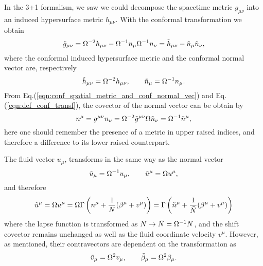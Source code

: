 In the 3+1 formalism, we saw we could decompose the spacetime metric $g_{\mu\nu}$ into an induced hypersurface metric $h_{\mu\nu}$. With the conformal transformation we obtain
\begin{equation}
    \Tilde{g}_{\mu\nu}=\Omega^{-2}h_{\mu\nu}-\Omega^{-1}n_\mu\Omega^{-1}n_\nu=\Tilde{h}_{\mu\nu}-\Tilde{n}_\mu\Tilde{n}_\nu,
    \label{eqn:conf_metric_decomp}
\end{equation}
where the conformal induced hypersurface metric and the conformal normal vector are, respectively
\begin{equation}
    \Tilde{h}_{\mu\nu}=\Omega^{-2}h_{\mu\nu}, \qquad \Tilde{n}_\mu=\Omega^{-1}n_\mu.
    \label{eqn:conf_spatial_metric_and_conf_normal_vec}
\end{equation}
From Eq.(\ref{eqn:conf_spatial_metric_and_conf_normal_vec}) and Eq.(\ref{eqn:def_conf_transf}), the covector of the normal vector can be obtain by
\begin{equation}
    n^\mu = g^{\mu\nu} n_\nu = \Omega^{-2} \Tilde{g}^{\mu\nu} \Omega \Tilde{n}_\nu = \Omega^{-1}\Tilde{n}^\mu,
\end{equation}
here one should remember the presence of a metric in upper raised indices, and therefore a difference to its lower raised counterpart.

The fluid vector $u_\mu$, transforms in the same way as the normal vector
\begin{equation}
    \Tilde{u}_\mu = \Omega^{-1}u_\mu, \qquad \Tilde{u}^\mu=\Omega u^\mu, 
\end{equation}
and therefore
\begin{equation}
    \Tilde{u}^\mu = \Omega u^\mu = \Omega \Gamma \left(n^\mu+\frac{1}{N}(\beta^\mu+v^\mu)\right) = \Gamma \left(\Tilde{n}^\mu+\frac{1}{\Tilde{N}}(\beta^\mu+v^\mu)\right)
\end{equation}
where the lapse function is transformed as $N\rightarrow \Tilde{N}=\Omega^{-1}N$, and the shift covector remains unchanged as well as the fluid coordinate velocity $v^\mu$. However, as mentioned, their contravectors are dependent on the transformation as
\begin{equation}
    \Tilde{v}_\mu=\Omega^2 v_\mu, \qquad \Tilde{\beta}_\mu = \Omega^2 \beta_\mu.
\end{equation}


